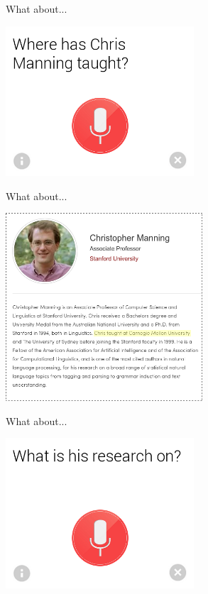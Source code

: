 \def\title{What about...}
\begin{frame}{\title}
\begin{center}
  \includegraphics[width=7cm]{../img/google-chris-manning-taught.png}
\end{center}
\end{frame}
\begin{frame}[noframenumbering]{\title}
\begin{center}
  \includegraphics[height=7cm]{../img/chris-coursera-taught.png} \\
\end{center}
\end{frame}
\begin{frame}[noframenumbering]{\title}
\begin{center}
  \includegraphics[width=7cm]{../img/google-chris-manning-research.png}
\end{center}
\end{frame}

